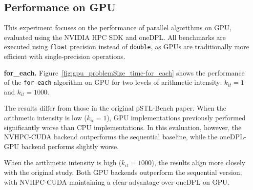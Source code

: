 \documentclass[sigconf]{acmart}
\newcommand{\mypar}[1]{{\bf #1.}}
\begin{document}
\subsection{Performance on GPU}

This experiment focuses on the performance of parallel algorithms on GPU,
evaluated using the NVIDIA HPC SDK and oneDPL. All benchmarks are executed
using \texttt{float} precision instead of \texttt{double}, as GPUs are
traditionally more efficient with single-precision operations.

\mypar{for\_each}
Figure~\ref{fig:gpu_problemSize_time-for_each} shows the performance of the
\texttt{for\_each} algorithm on GPU for two levels of arithmetic intensity:
$k_{it} = 1$ and $k_{it} = 1000$.

The results differ from those in the original pSTL-Bench paper. When the
arithmetic intensity is low ($k_{it} = 1$), GPU implementations previously
performed significantly worse than CPU implementations. In this evaluation,
however, the NVHPC-CUDA backend outperforms the sequential baseline, while the
oneDPL-GPU backend performs slightly worse.

When the arithmetic intensity is high ($k_{it} = 1000$), the results align more
closely with the original study. Both GPU backends outperform the sequential
version, with NVHPC-CUDA maintaining a clear advantage over oneDPL on GPU.
\end{document}
